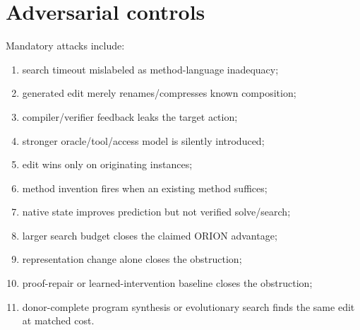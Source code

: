 \section{Adversarial controls}
Mandatory attacks include:
\begin{enumerate}
    \item search timeout mislabeled as method-language inadequacy;
    \item generated edit merely renames/compresses known composition;
    \item compiler/verifier feedback leaks the target action;
    \item stronger oracle/tool/access model is silently introduced;
    \item edit wins only on originating instances;
    \item method invention fires when an existing method suffices;
    \item native state improves prediction but not verified solve/search;
    \item larger search budget closes the claimed ORION advantage;
    \item representation change alone closes the obstruction;
    \item proof-repair or learned-intervention baseline closes the obstruction;
    \item donor-complete program synthesis or evolutionary search finds the same edit at matched cost.
\end{enumerate}

